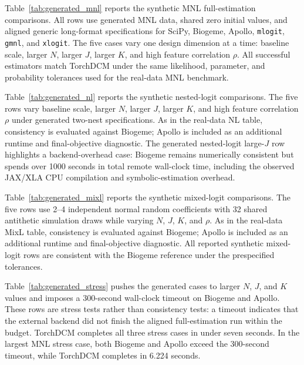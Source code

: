 

Table~\ref{tab:generated_mnl} reports the synthetic MNL full-estimation comparisons.
All rows use generated MNL data, shared zero initial values, and aligned generic long-format specifications for SciPy, Biogeme, Apollo, \texttt{mlogit}, \texttt{gmnl}, and \texttt{xlogit}.
The five cases vary one design dimension at a time: baseline scale, larger $N$, larger $J$, larger $K$, and high feature correlation $\rho$.
All successful estimators match TorchDCM under the same likelihood, parameter, and probability tolerances used for the real-data MNL benchmark.



Table~\ref{tab:generated_nl} reports the synthetic nested-logit comparisons.
The five rows vary baseline scale, larger $N$, larger $J$, larger $K$, and high feature correlation $\rho$ under generated two-nest specifications.
As in the real-data NL table, consistency is evaluated against Biogeme; Apollo is included as an additional runtime and final-objective diagnostic.
The generated nested-logit large-$J$ row highlights a backend-overhead case: Biogeme remains numerically consistent but spends over 1000 seconds in total remote wall-clock time, including the observed JAX/XLA CPU compilation and symbolic-estimation overhead.



Table~\ref{tab:generated_mixl} reports the synthetic mixed-logit comparisons.
The five rows use 2--4 independent normal random coefficients with 32 shared antithetic simulation draws while varying $N$, $J$, $K$, and $\rho$.
As in the real-data MixL table, consistency is evaluated against Biogeme; Apollo is included as an additional runtime and final-objective diagnostic.
All reported synthetic mixed-logit rows are consistent with the Biogeme reference under the prespecified tolerances.



Table~\ref{tab:generated_stress} pushes the generated cases to larger $N$, $J$, and $K$ values and imposes a 300-second wall-clock timeout on Biogeme and Apollo.
These rows are stress tests rather than consistency tests: a timeout indicates that the external backend did not finish the aligned full-estimation run within the budget.
TorchDCM completes all three stress cases in under seven seconds.
In the largest MNL stress case, both Biogeme and Apollo exceed the 300-second timeout, while TorchDCM completes in 6.224 seconds.

